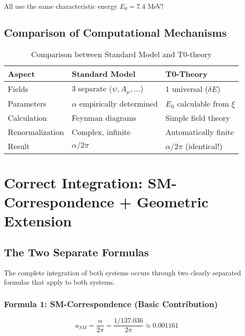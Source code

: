 \documentclass[12pt,a4paper]{article}
\numberwithin{equation}{section}
\newcommand{\xipar}{\xi}
\begin{document}
	All use the same characteristic energy $E_0 = 7.4$ MeV!
	
	\subsection{Comparison of Computational Mechanisms}
	
	\begin{table}[H]
		\centering
		\begin{tabular}{lll}
			\toprule
			\textbf{Aspect} & \textbf{Standard Model} & \textbf{T0-Theory} \\
			\midrule
			Fields & 3 separate ($\psi, A_\mu, \ldots$) & 1 universal ($\delta E$) \\
			Parameters & $\alpha$ empirically determined & $E_0$ calculable from $\xipar$ \\
			Calculation & Feynman diagrams & Simple field theory \\
			Renormalization & Complex, infinite & Automatically finite \\
			Result & $\alpha/2\pi$ & $\alpha/2\pi$ (identical!) \\
			\bottomrule
		\end{tabular}
		\caption{Comparison between Standard Model and T0-theory}
		\label{tab:comparison}
	\end{table}
	
	\section{Correct Integration: SM-Correspondence + Geometric Extension}
	
	\subsection{The Two Separate Formulas}
	
	The complete integration of both systems occurs through two clearly separated formulas that apply to both systems.
	
	\subsubsection{Formula 1: SM-Correspondence (Basic Contribution)}
	
	\begin{equation}
		\label{eq:sm_basic}
		a_{SM} = \frac{\alpha}{2\pi} = \frac{1/137.036}{2\pi} \approx 0.001161
	\end{equation}
	
\end{document}
